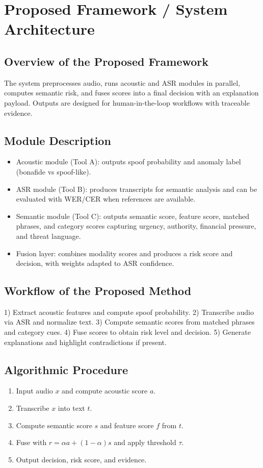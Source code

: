 \documentclass[11pt,a4paper]{article}
\begin{document}
\section{Proposed Framework / System Architecture}
\subsection{Overview of the Proposed Framework}
The system preprocesses audio, runs acoustic and ASR modules in parallel, computes semantic risk, and fuses scores into a final decision with an explanation payload. Outputs are designed for human-in-the-loop workflows with traceable evidence.

\subsection{Module Description}
\begin{itemize}[noitemsep]
\item Acoustic module (Tool A): outputs spoof probability and anomaly label (bonafide vs spoof-like).
\item ASR module (Tool B): produces transcripts for semantic analysis and can be evaluated with WER/CER when references are available.
\item Semantic module (Tool C): outputs semantic score, feature score, matched phrases, and category scores capturing urgency, authority, financial pressure, and threat language.
\item Fusion layer: combines modality scores and produces a risk score and decision, with weights adapted to ASR confidence.
\end{itemize}

\subsection{Workflow of the Proposed Method}
1) Extract acoustic features and compute spoof probability. 2) Transcribe audio via ASR and normalize text. 3) Compute semantic scores from matched phrases and category cues. 4) Fuse scores to obtain risk level and decision. 5) Generate explanations and highlight contradictions if present.

\subsection{Algorithmic Procedure}
\begin{enumerate}[noitemsep]
\item Input audio $x$ and compute acoustic score $a$.
\item Transcribe $x$ into text $t$.
\item Compute semantic score $s$ and feature score $f$ from $t$.
\item Fuse with $r = \alpha a + (1-\alpha)s$ and apply threshold $\tau$.
\item Output decision, risk score, and evidence.
\end{enumerate}
\end{document}

